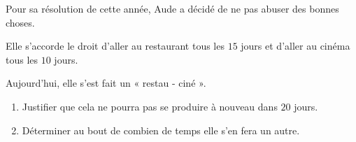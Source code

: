 \begin{exercice*}
    Pour sa résolution de cette année, Aude a décidé de ne pas abuser des bonnes choses.

    Elle s'accorde le droit d'aller au restaurant tous les $15$ jours et d'aller au cinéma tous les $10$ jours.

    Aujourd'hui, elle s'est fait un « restau - ciné ».

    \begin{enumerate}
        \item Justifier que cela ne pourra pas se produire à nouveau dans $20$ jours.
        \item Déterminer au bout de combien de temps elle s'en fera un autre.
    \end{enumerate}

\end{exercice*}

